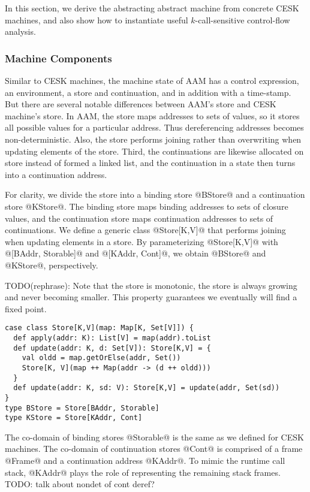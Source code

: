 \documentclass[acmsmall,review,anonymous]{acmart}\settopmatter{printfolios=true,printccs=false,printacmref=false}
\begin{document}
In this section, we derive the abstracting abstract machine from concrete
CESK machines, and also show how to instantiate
useful $k$-call-sensitive control-flow analysis.

\subsubsection{Machine Components}

Similar to CESK machines, the machine state of AAM has a control expression,
an environment, a store and continuation, and in addition with a time-stamp.
But there are several notable differences between AAM's store and CESK machine's store.
In AAM, the store maps addresses to sets of values, so it stores all possible values
for a particular address. Thus dereferencing addresses becomes non-deterministic.
Also, the store performs joining  rather than overwriting when updating elements of the store.
Third, the continuations are likewise allocated on store instead of formed a linked list,
and the continuation in a state then turns into a continuation address.

For clarity, we divide the store into a binding store @BStore@ and a continuation store @KStore@. 
The binding store maps binding addresses to sets of closure values, and the continuation store maps
continuation addresses to sets of continuations.
We define a generic class @Store[K,V]@ that performs joining when updating elements
in a store. By parameterizing @Store[K,V]@ with @[BAddr, Storable]@ and 
@[KAddr, Cont]@, we obtain @BStore@ and @KStore@, perspectively.

TODO(rephrase): Note that the store is monotonic, the store is always growing and never becoming 
smaller. This property guarantees we eventually will find a fixed point.

\begin{lstlisting}
case class Store[K,V](map: Map[K, Set[V]]) {
  def apply(addr: K): List[V] = map(addr).toList
  def update(addr: K, d: Set[V]): Store[K,V] = {
    val oldd = map.getOrElse(addr, Set())
    Store[K, V](map ++ Map(addr -> (d ++ oldd)))
  }
  def update(addr: K, sd: V): Store[K,V] = update(addr, Set(sd))
}
type BStore = Store[BAddr, Storable]
type KStore = Store[KAddr, Cont]
\end{lstlisting}

The co-domain of binding stores @Storable@ is the same
as we defined for CESK machines.
The co-domain of continuation stores @Cont@ is comprised of 
a frame @Frame@ and a continuation address @KAddr@.
To mimic the runtime call stack, @KAddr@ plays the role of
representing the remaining stack frames.
TODO: talk about nondet of cont deref?
\end{document}
